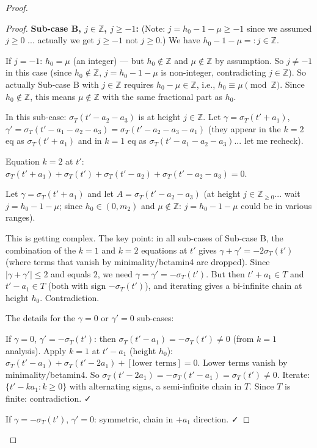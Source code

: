 \begin{proof}
\begin{proof}
\textbf{Sub-case B, $j \in \mathbb{Z}$, $j \geq -1$:} (Note: $j = h_0-1-\mu \geq -1$ since we assumed $j \geq 0$ ... actually we get $j \geq -1$ not $j \geq 0$.) We have $h_0-1-\mu =: j \in \mathbb{Z}$.

If $j = -1$: $h_0 = \mu$ (an integer) — but $h_0 \notin \mathbb{Z}$ and $\mu \notin \mathbb{Z}$ by assumption. So $j \neq -1$ in this case (since $h_0 \notin \mathbb{Z}$, $j = h_0-1-\mu$ is non-integer, contradicting $j \in \mathbb{Z}$). So actually Sub-case B with $j \in \mathbb{Z}$ requires $h_0 - \mu \in \mathbb{Z}$, i.e., $h_0 \equiv \mu \pmod{\mathbb{Z}}$. Since $h_0 \notin \mathbb{Z}$, this means $\mu \notin \mathbb{Z}$ with the same fractional part as $h_0$.

In this sub-case: $\sigma_T(t'-a_2-a_3)$ is at height $j \in \mathbb{Z}$. Let $\gamma = \sigma_T(t'+a_1)$, $\gamma' = \sigma_T(t'-a_1-a_2-a_3) = \sigma_T(t'-a_2-a_3-a_1)$ (they appear in the $k=2$ eq as $\sigma_T(t'+a_1)$ and in $k=1$ eq as $\sigma_T(t'-a_1-a_2-a_3)$... let me recheck).

Equation $k=2$ at $t'$: $\sigma_T(t'+a_1)+\sigma_T(t')+\sigma_T(t'-a_2)+\sigma_T(t'-a_2-a_3)=0$.

Let $\gamma = \sigma_T(t'+a_1)$ and let $A = \sigma_T(t'-a_2-a_3)$ (at height $j \in \mathbb{Z}_{\geq 0}$... wait $j = h_0-1-\mu$; since $h_0 \in (0,m_2)$ and $\mu \notin \mathbb{Z}$: $j = h_0-1-\mu$ could be in various ranges).

This is getting complex. The key point: in all sub-cases of Sub-case B, the combination of the $k=1$ and $k=2$ equations at $t'$ gives $\gamma + \gamma' = -2\sigma_T(t')$ (where terms that vanish by minimality/betamin4 are dropped). Since $|\gamma+\gamma'| \leq 2$ and equals $2$, we need $\gamma = \gamma' = -\sigma_T(t')$. But then $t'+a_1 \in T$ and $t'-a_1 \in T$ (both with sign $-\sigma_T(t')$), and iterating gives a bi-infinite chain at height $h_0$. Contradiction.

The details for the $\gamma=0$ or $\gamma'=0$ sub-cases:

If $\gamma = 0$, $\gamma' = -\sigma_T(t')$: then $\sigma_T(t'-a_1) = -\sigma_T(t') \neq 0$ (from $k=1$ analysis). Apply $k=1$ at $t'-a_1$ (height $h_0$): $\sigma_T(t'-a_1)+\sigma_T(t'-2a_1)+[\text{lower terms}]=0$. Lower terms vanish by minimality/betamin4. So $\sigma_T(t'-2a_1)=-\sigma_T(t'-a_1)=\sigma_T(t') \neq 0$. Iterate: $\{t'-ka_1:k\geq 0\}$ with alternating signs, a semi-infinite chain in $T$. Since $T$ is finite: contradiction. ✓

If $\gamma = -\sigma_T(t')$, $\gamma'=0$: symmetric, chain in $+a_1$ direction. ✓


\end{proof}
\end{proof}
